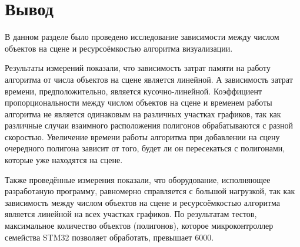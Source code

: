 \newpage
\section{Вывод}
В данном разделе было проведено исследование зависимости между числом объектов на сцене и ресурсоёмкостью алгоритма визуализации.

Результаты измерений показали, что зависимость затрат памяти на работу алгоритма от числа объектов на сцене является линейной. 
А зависимость затрат времени, предположительно, является кусочно-линейной. Коэффициент пропорциональности между числом объектов на сцене 
и временем работы алгоритма не является одинаковым на различных участках графиков, так как различные случаи взаимного расположения 
полигонов обрабатываются с разной скоростью. Увеличение времени работы алгоритма при добавлении на сцену очередного полигона зависит от 
того, будет ли он пересекаться с полигонами, которые уже находятся на сцене.

Также проведённые измерения показали, что оборудование, исполняющее разработаную программу, равномерно справляется с большой нагрузкой, 
так как зависимость между числом объектов на сцене и ресурсоёмкостью алгоритма является линейной на всех участках графиков. По результатам 
тестов, максимальное количество объектов (полигонов), которое микроконтроллер семейства STM32 позволяет обработать, превышает 6000.

